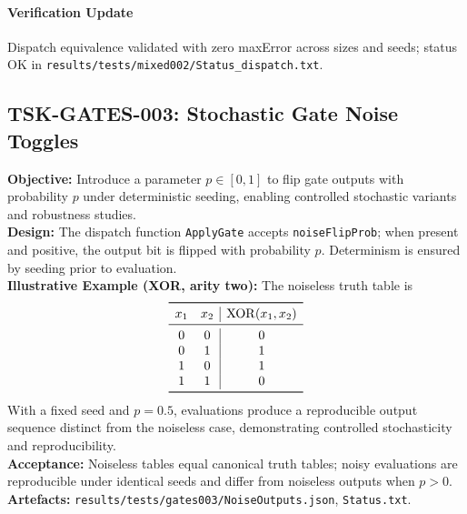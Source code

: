 \documentclass[11pt]{article}
\begin{document}
\paragraph{Verification Update} Dispatch equivalence validated with zero maxError across sizes and seeds; status OK in \texttt{results/tests/mixed002/Status\_dispatch.txt}.

\subsection{TSK-GATES-003: Stochastic Gate Noise Toggles}
\textbf{Objective:} Introduce a parameter \(p\in[0,1]\) to flip gate outputs with probability \(p\) under deterministic seeding, enabling controlled stochastic variants and robustness studies.\\
\textbf{Design:} The dispatch function \texttt{ApplyGate} accepts \texttt{noiseFlipProb}; when present and positive, the output bit is flipped with probability \(p\). Determinism is ensured by seeding prior to evaluation.\\
\textbf{Illustrative Example (XOR, arity two):} The noiseless truth table is
\[
\begin{array}{cc|c}
\toprule
 x_1 & x_2 & \mathrm{XOR}(x_1,x_2) \\
\midrule
 0 & 0 & 0 \\
 0 & 1 & 1 \\
 1 & 0 & 1 \\
 1 & 1 & 0 \\
\bottomrule
\end{array}
\]
With a fixed seed and \(p=0.5\), evaluations produce a reproducible output sequence distinct from the noiseless case, demonstrating controlled stochasticity and reproducibility.\\
\textbf{Acceptance:} Noiseless tables equal canonical truth tables; noisy evaluations are reproducible under identical seeds and differ from noiseless outputs when \(p>0\).\\
\textbf{Artefacts:} \texttt{results/tests/gates003/NoiseOutputs.json}, \texttt{Status.txt}.
\end{document}
